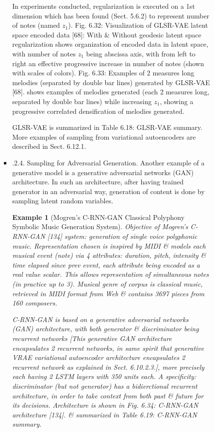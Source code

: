 \documentclass{article}
\newtheorem{example}{Example}
\begin{document}
\begin{itemize}
\begin{itemize}
\begin{itemize}
\begin{itemize}
				In experiments conducted, regularization is executed on a 1st dimension which has been found (Sect. 5.6.2) to represent number of notes (named $z_1$). {\sf Fig. 6.32: Visualization of GLSR-VAE latent space encoded data [68]: With \& Without geodesic latent space regularization} shows organization of encoded data in latent space, with number of notes $z_1$ being abscissa axis, with from left to right an effective progressive increase in number of notes (shown with scales of colors). {\sf Fig. 6.33: Examples of 2 measures long melodies (separated by double bar lines) generated by GLSR-VAE [68].} shows examples of melodies generated (each 2 measures long, separated by double bar lines) while increasing $z_1$, showing a progressive correlated densification of melodies generated.

				GLSR-VAE is summarized in {\sf Table 6.18: GLSR-VAE summary}. More examples of sampling from variational autoencoders are described in Sect. 6.12.1.
				\item {.2.4. Sampling for Adversarial Generation.} Another example of a generative model is a generative adversarial networks (GAN) architecture. In such an architecture, after having trained generator in an adversarial way, generation of content is done by sampling latent random variables.
				\begin{example}[Mogren's C-RNN-GAN Classical Polyphony Symbolic Music Generation System]
					Objective of Mogren's C-RNN-GAN [134] system: generation of single voice polyphonic music. Representation chosen is inspired by MIDI \& models each musical event (note) via 4 attributes: duration, pitch, intensity \& time elapsed since prev event, each attribute being encoded as a real value scalar. This allows representation of simultaneous notes (in practice up to 3). Musical genre of corpus is classical music, retrieved in MIDI format from Web \& contains 3697 pieces from 160 composers.

					C-RNN-GAN is based on a generative adversarial networks (GAN) architecture, with both generator \& discriminator being recurrent networks [This generative GAN architecture encapsulates 2 recurrent networks, in same spirit that generative VRAE variational autoencoder architecture encapsulates 2 recurrent network as explained in Sect. 6.10.2.3.], more precisely each having 2 LSTM layers with 350 units each. A specificity: discriminator (but not generator) has a bidierctional recurrent architecture, in order to take context from both past \& future for its decisions. Architecture is shown in {\sf Fig. 6.34: C-RNN-GAN architecture [134].} \& summarized in {\sf Table 6.19: C-RNN-GAN summary}.


\end{example}
\end{itemize}
\end{itemize}
\end{itemize}
\end{itemize}
\end{document}
